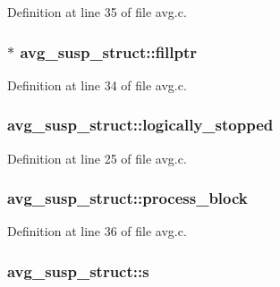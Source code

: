 Definition at line 35 of file avg.\+c.

\subsubsection[{\texorpdfstring{fillptr}{fillptr}}]{$\ast$ avg\+\_\+susp\+\_\+struct\+::fillptr}\hypertarget{structavg__susp__struct_aebe3016ebac871ef4aef1add9d8d4487}{}\label{structavg__susp__struct_aebe3016ebac871ef4aef1add9d8d4487}


Definition at line 34 of file avg.\+c.

\subsubsection[{\texorpdfstring{logically\+\_\+stopped}{logically_stopped}}]{ avg\+\_\+susp\+\_\+struct\+::logically\+\_\+stopped}\hypertarget{structavg__susp__struct_a4012d8bffd01a8a9f93cbfc52ee12a8d}{}\label{structavg__susp__struct_a4012d8bffd01a8a9f93cbfc52ee12a8d}


Definition at line 25 of file avg.\+c.

\subsubsection[{\texorpdfstring{process\+\_\+block}{process_block}}]{ avg\+\_\+susp\+\_\+struct\+::process\+\_\+block}\hypertarget{structavg__susp__struct_a0490e46d3810e05d9d719bf5647993f0}{}\label{structavg__susp__struct_a0490e46d3810e05d9d719bf5647993f0}


Definition at line 36 of file avg.\+c.

\subsubsection[{\texorpdfstring{s}{s}}]{ avg\+\_\+susp\+\_\+struct\+::s}\hypertarget{structavg__susp__struct_a13f1d3ab79d8229157fd96a316641904}{}\label{structavg__susp__struct_a13f1d3ab79d8229157fd96a316641904}


